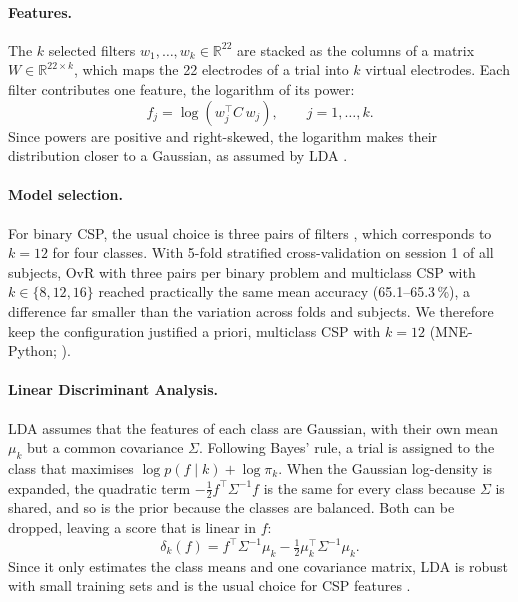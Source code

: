 \paragraph{Features.}
The $k$ selected filters $w_1, \dots, w_k \in \mathbb{R}^{22}$ are stacked as the columns of a matrix $W \in \mathbb{R}^{22 \times k}$, which maps the 22 electrodes of a trial into $k$ virtual electrodes. Each filter contributes one feature, the logarithm of its power:
\begin{equation}
  f_j = \log \left( w_j^\top C \, w_j \right), \qquad j = 1, \dots, k.
  \label{eq:logpower}
\end{equation}
Since powers are positive and right-skewed, the logarithm makes their distribution closer to a Gaussian, as assumed by LDA \citep{blankertz2008}.

\paragraph{Model selection.}
For binary CSP, the usual choice is three pairs of filters \citep{blankertz2008, lotte2011}, which corresponds to $k = 12$ for four classes. With 5-fold stratified cross-validation on session 1 of all subjects, OvR with three pairs per binary problem and multiclass CSP with $k \in \{8, 12, 16\}$ reached practically the same mean accuracy (65.1--65.3\,\%), a difference far smaller than the variation across folds and subjects. We therefore keep the configuration justified a priori, multiclass CSP with $k = 12$ (MNE-Python; \citealp{gramfort2013}).

\paragraph{Linear Discriminant Analysis.}
LDA assumes that the features of each class are Gaussian, with their own mean $\mu_k$ but a common covariance $\Sigma$. Following Bayes' rule, a trial is assigned to the class that maximises $\log p(f \mid k) + \log \pi_k$. When the Gaussian log-density is expanded, the quadratic term $-\frac{1}{2} f^\top \Sigma^{-1} f$ is the same for every class because $\Sigma$ is shared, and so is the prior because the classes are balanced. Both can be dropped, leaving a score that is linear in $f$:
\begin{equation}
  \delta_k(f) = f^\top \Sigma^{-1} \mu_k - \tfrac{1}{2} \mu_k^\top \Sigma^{-1} \mu_k.
  \label{eq:lda}
\end{equation}
Since it only estimates the class means and one covariance matrix, LDA is robust with small training sets and is the usual choice for CSP features \citep{blankertz2008}.

